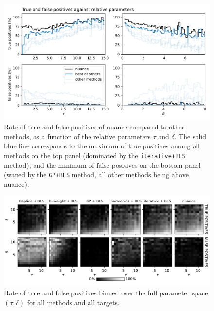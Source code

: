 \documentclass[modern]{aastex631}
\newcommand{\nuancecode}{\textsf{nuance}}
\begin{document}
\begin{figure}[H]
    \begin{centering}
        \includegraphics[width=\linewidth]{../workflows/tess_injection_recovery/figures/tpfp.pdf}
        \caption{Rate of true and false positives of \nuancecode{} compared to other methods, as a function of the relative parameters $\tau$ and $\delta$. The solid blue line corresponds to the maximum of true positives among all methods on the top panel (dominated by the \texttt{iterative+BLS} method), and the minimum of false positives on the bottom panel (waned by the \texttt{GP+BLS} method, all other methods being above \nuancecode{}).}
        \label{fig:allsearch_relative}
    \end{centering}
\end{figure}
\begin{figure}[H]
    \begin{centering}
        \includegraphics[width=\linewidth]{../workflows/tess_injection_recovery/figures/tpfp_ims.pdf}
        \caption{Rate of true and false positives binned over the full parameter space $(\tau, \delta)$ for all methods and all targets.}
        \label{fig:allsearchim}
    \end{centering}
\end{figure}
\end{document}
